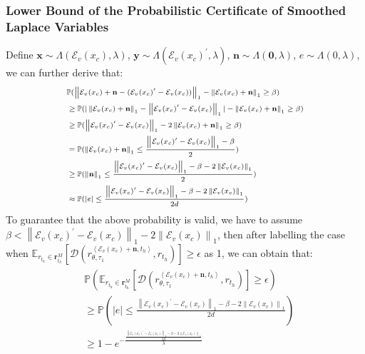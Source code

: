 \subsubsection{Lower Bound of the Probabilistic Certificate of Smoothed Laplace Variables}
\label{lb-lp}
Define $\mathbf{x}\sim\Lambda(\mathcal{E}_v(x_c), \lambda)$, $\mathbf{y}\sim\Lambda(\mathcal{E}_v(x_c)^{\prime}, \lambda)$, $\mathbf{n}\sim\Lambda(\mathbf{0}, \lambda)$, $e\sim\Lambda(0, \lambda)$, we can further derive that:
\begin{align}
\scriptsize
\begin{split}
&\mathbb{P}(\left\|\mathcal{E}_v(x_c)+\mathbf{n}-(\mathcal{E}_v(x_c)^{\prime}-\mathcal{E}_v(x_c))\right\|_1-\left\|\mathcal{E}_v(x_c)+\mathbf{n}\right\|_1\geq\beta)\\
&\geq\mathbb{P}(|\left\|\mathcal{E}_v(x_c)+\mathbf{n}\right\|_1-\left\|\mathcal{E}_v(x_c)^{\prime}-\mathcal{E}_v(x_c)\right\|_1|-\left\|\mathcal{E}_v(x_c)+\mathbf{n}\right\|_1\geq\beta)\\
&\geq\mathbb{P}(\left\|\mathcal{E}_v(x_c)^{\prime}-\mathcal{E}_v(x_c)\right\|_1-2\left\|\mathcal{E}_v(x_c)+\mathbf{n}\right\|_1\geq\beta)\\
&=\mathbb{P}(\left\|\mathcal{E}_v(x_c)+\mathbf{n}\right\|_1\leq\frac{\left\|\mathcal{E}_v(x_c)^{\prime}-\mathcal{E}_v(x_c)\right\|_1-\beta}{2})\\
&\geq\mathbb{P}(\left\|\mathbf{n}\right\|_1\leq\frac{\left\|\mathcal{E}_v(x_c)^{\prime}-\mathcal{E}_v(x_c)\right\|_1-\beta-2\left\|\mathcal{E}_v(x_c)\right\|_1}{2})\\
&\approx\mathbb{P}(|e|\leq\frac{\left\|\mathcal{E}_v(x_c)^{\prime}-\mathcal{E}_v(x_c)\right\|_1-\beta-2\left\|\mathcal{E}_v(x_c)\right\|_1}{2d})
\end{split}
\end{align}
To guarantee that the above probability is valid, we have to assume $\beta<\left\|\mathcal{E}_v(x_c)^{\prime}-\mathcal{E}_v(x_c)\right\|_1-2\left\|\mathcal{E}_v(x_c)\right\|_1$, then after labelling the case when $\mathbb{E}_{r_{t_h}\in\mathbf{r}_{t_h}^M}[\mathcal{D}(r_{\theta, \tau_1}^{\left<\mathcal{E}_v(x_c)+\mathbf{n}, t_h\right>}, r_{t_h})]\geq\epsilon$ as 1, we can obtain that:
\begin{align}
\begin{split}
&\mathbb{P}(\mathbb{E}_{r_{t_h}\in\mathbf{r}_{t_h}^M}[\mathcal{D}(r_{\theta, \tau_1}^{\left<\mathcal{E}_v(x_c)+\mathbf{n}, t_h\right>}, r_{t_h})]\geq\epsilon)\\
&\geq\mathbb{P}(|e|\leq\frac{\left\|\mathcal{E}_v(x_c)^{\prime}-\mathcal{E}_v(x_c)\right\|_1-\beta-2\left\|\mathcal{E}_v(x_c)\right\|_1}{2d})\\
&\geq1 - e^{-\frac{\frac{\left\|\mathcal{E}_v(x_c)^{\prime}-\mathcal{E}_v(x_c)\right\|_1-\beta-2\left\|\mathcal{E}_v(x_c)\right\|_1}{2d}}{\lambda}}
\end{split}
\end{align}
